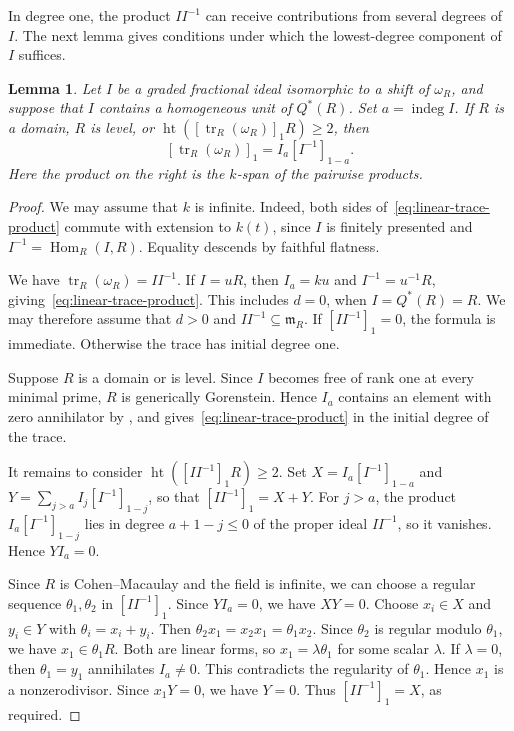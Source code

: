 \documentclass[a4paper,11pt]{amsart}
\DeclareMathOperator{\tr}{tr}
\DeclareMathOperator{\indeg}{indeg}
\DeclareMathOperator{\Hom}{Hom}
\DeclareMathOperator{\height}{ht}
\newcommand{\kk}{k}
\newcommand{\m}{\mathfrak{m}}
\newtheorem{lemma}[theorem]{Lemma}
\theoremstyle{definition}
\begin{document}
In degree one, the product $II^{-1}$ can receive contributions from several degrees of $I$. The next lemma gives conditions under which the lowest-degree component of $I$ suffices.

\begin{lemma}\label{lem:linear-trace-product}
Let $I$ be a graded fractional ideal isomorphic to a shift of $\omega_R$, and suppose that $I$ contains a homogeneous unit of $Q^*(R)$. Set $a=\indeg I$. If $R$ is a domain, $R$ is level, or $\height([\tr_R(\omega_R)]_1R)\ge2$, then
\begin{equation}\label{eq:linear-trace-product}
 [\tr_R(\omega_R)]_1=I_a[I^{-1}]_{1-a}.
\end{equation}
Here the product on the right is the $\kk$-span of the pairwise products.
\end{lemma}
\begin{proof}
We may assume that $\kk$ is infinite. Indeed, both sides of~\eqref{eq:linear-trace-product} commute with extension to $\kk(t)$, since $I$ is finitely presented and $I^{-1}=\Hom_R(I,R)$. Equality descends by faithful flatness.

We have $\tr_R(\omega_R)=II^{-1}$. If $I=uR$, then $I_a=\kk u$ and $I^{-1}=u^{-1}R$, giving~\eqref{eq:linear-trace-product}. This includes $d=0$, when $I=Q^*(R)=R$. We may therefore assume that $d>0$ and $II^{-1}\subseteq\m_R$. If $[II^{-1}]_1=0$, the formula is immediate. Otherwise the trace has initial degree one.

Suppose $R$ is a domain or is level. Since $I$ becomes free of rank one at every minimal prime, $R$ is generically Gorenstein. Hence $I_a$ contains an element with zero annihilator by \cite[Remark~3.14]{M26}, and \cite[Lemma~2.12~(2)]{M26} gives~\eqref{eq:linear-trace-product} in the initial degree of the trace.

It remains to consider $\height([II^{-1}]_1R)\ge2$. Set $X=I_a[I^{-1}]_{1-a}$ and $Y=\sum_{j>a}I_j[I^{-1}]_{1-j}$, so that $[II^{-1}]_1=X+Y$. For $j>a$, the product $I_a[I^{-1}]_{1-j}$ lies in degree $a+1-j\le0$ of the proper ideal $II^{-1}$, so it vanishes. Hence $YI_a=0$.

Since $R$ is Cohen--Macaulay and the field is infinite, we can choose a regular sequence $\theta_1,\theta_2$ in $[II^{-1}]_1$. Since $YI_a=0$, we have $XY=0$. Choose $x_i\in X$ and $y_i\in Y$ with $\theta_i=x_i+y_i$. Then $\theta_2x_1=x_2x_1=\theta_1x_2$. Since $\theta_2$ is regular modulo $\theta_1$, we have $x_1\in\theta_1R$. Both are linear forms, so $x_1=\lambda\theta_1$ for some scalar $\lambda$. If $\lambda=0$, then $\theta_1=y_1$ annihilates $I_a\ne0$. This contradicts the regularity of $\theta_1$. Hence $x_1$ is a nonzerodivisor. Since $x_1Y=0$, we have $Y=0$. Thus $[II^{-1}]_1=X$, as required.
\end{proof}
\end{document}
